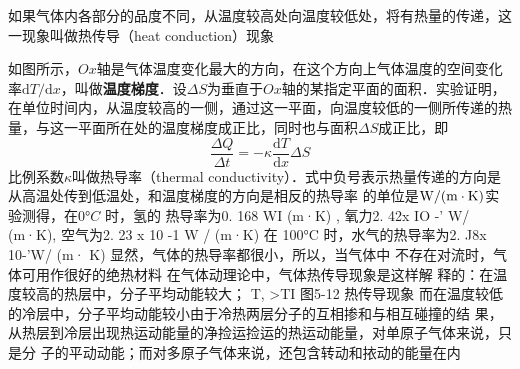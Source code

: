 
如果气体内各部分的品度不同，从温度较高处向温度较低处，将有热量的传递，这一现象叫做热传导（heat conduction）现象

如图所示，$Ox$轴是气体温度变化最大的方向，在这个方向上气体温度的空间变化率$\mathrm dT/\mathrm dx$，叫做\textbf{温度梯度}．设$\Delta S$为垂直于$Ox $轴的某指定平面的面积．实验证明，在单位时间内，从温度较高的一侧，通过这一平面，向温度较低的一侧所传递的热量，与这一平面所在处的温度梯度成正比，同时也与面积$\Delta S$成正比，即
\begin{equation}
\frac{\Delta Q}{\Delta t}=-\kappa \frac{\mathrm{d} T}{\mathrm{d} x} \Delta S
\end{equation}
比例系数$\kappa$叫做热导率（thermal conductivity）．式中负号表示热量传递的方向是从高温处传到低温处，和温度梯度的方向是相反的热导率
的单位是$\rm W /(m \cdot K)$实验测得，在$0°C$ 时，氢的
热导率为0. 168 WI (m·K) , 氧力2. 42x IO -' W/
(m·K), 空气为2. 23 x 10 -1 W / (m·K) 在
100°C 时，水气的热导率为2. J8x 10-'W/ (m·
K) 显然，气体的热导率都很小，所以，当气体中
不存在对流时，气体可用作很好的绝热材料
在气体动理论中，气体热传导现象是这样解
释的：在温度较高的热层中，分子平均动能较大；
T, >TI
图5-12 热传导现象
而在温度较低的冷层中，分子平均动能较小由于冷热两层分子的互相掺和与相互碰撞的结
果，从热层到冷层出现热运动能量的净捡运捡运的热运动能量，对单原子气体来说，只是分
子的平动动能；而对多原子气体来说，还包含转动和挔动的能量在内